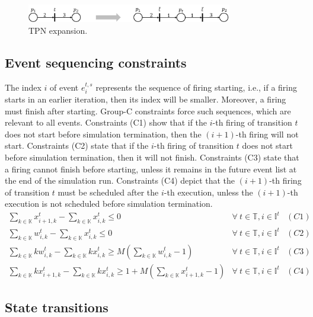 \documentclass[suppldata]{interact}
\theoremstyle{plain}
\theoremstyle{definition}
\theoremstyle{remark}
\begin{document}
\begin{figure}[h]
	\centering
	\includegraphics[width=0.8\textwidth]{Figures/TPN_expansion.png}
	\caption{TPN expansion.}
	\label{fig:tpn_expansion}
\end{figure}


\subsection{Event sequencing constraints}
The index $i$ of event $e^{t,s}_i$ represents the sequence of firing starting, i.e., if a firing starts in an earlier iteration, then its index will be smaller. Moreover, a firing must finish after starting. Group-C constraints force such sequences, which are relevant to all events. Constraints (C1) show that if the $i$-th firing of transition $t$ does not start before simulation termination, then the $(i+1)$-th firing will not start. Constraints (C2) state that if the $i$-th firing of transition $t$ does not start before simulation termination, then it will not finish. Constraints (C3) state that a firing cannot finish before starting, unless it remains in the future event list at the end of the simulation run. Constraints (C4) depict that the $(i+1)$-th firing of transition $t$ must be scheduled after the $i$-th execution, unless the $(i+1)$-th execution is not scheduled before simulation termination.
\begin{eqnarray}
	\sum_{k\in \mathbb{K}} x^{t}_{i+1,k} - \sum_{k\in \mathbb{K}} x^{t}_{i,k} \le 0&  \forall\ t\in \mathbb{T},i\in \mathbb{I}^{t}&(C1)\nonumber\\
	\sum_{k\in \mathbb{K}} w^{t}_{i,k}-\sum_{k\in \mathbb{K}} x^{t}_{i,k} \le 0&  \forall\ t\in \mathbb{T},i\in \mathbb{I}^{t}&(C2)\nonumber\\
	\sum_{k\in \mathbb{K}} kw^{t}_{i,k} - \sum_{k\in \mathbb{K}} kx^{t}_{i,k} \ge M(\sum_{k\in \mathbb{K}} w^{t}_{i,k}-1) &\forall\ t\in \mathbb{T}, i\in \mathbb{I}^{t}&(C3) \nonumber\\
	\sum_{k\in \mathbb{K}} kx^{t}_{i+1,k} - \sum_{k\in \mathbb{K}} kx^{t}_{i,k} \ge 1+M(\sum_{k\in \mathbb{K}} x^{t}_{i+1,k}-1)&  \forall\ t\in \mathbb{T},i\in \mathbb{I}^{t}&(C4)\nonumber
\end{eqnarray}

\subsection{State transitions}
\end{document}
